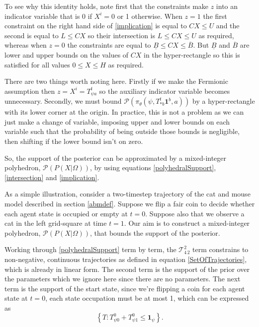 \documentclass{article}
\begin{document}
To see why this identity holds, note first that the constraints make $z$ into an indicator variable that is 0 if $X^i=0$ or 1 otherwise. When $z=1$ the first constraint on the right hand side of \eqref{implication} is equal to $CX \le U$ and the second is equal to $L \le CX$ so their intersection is $L \le  CX \le U$ as required, whereas when $z=0$ the constraints are equal to $\underline{B} \le CX \le \overline{B}$. But $\underline{B}$ and $\overline{B}$ are lower and upper bounds on the values of $CX$ in the hyper-rectangle so this is satisfied for all values $0 \le X \le H$ as required. 

There are two things worth noting here. Firstly if we make the Fermionic assumption then $z = X^i = T^t_{\psi a}$ so the auxiliary indicator variable becomes unnecessary. Secondly, we must bound $\mathcal{P}(\pi_\theta(\psi,T^t_{*b}\mathbf{1}^b,a))$ by a hyper-rectangle with its lower corner at the origin. In practice, this is not a problem as we can just make a change of variable, imposing upper and lower bounds on each variable such that the probability of being outside those bounds is negligible, then shifting if the lower bound isn't on zero.

So, the support of the posterior can be approximated by a mixed-integer polyhedron, $\mathcal{P}(P(X|\Omega))$, by using equations \eqref{polyhedralSupport}, \eqref{intersection} and \eqref{implication}.

As a simple illustration, consider a two-timestep trajectory of the cat and mouse model described in section \ref{abmdef}. Suppose we flip a fair coin to decide whether each agent state is occupied or empty at $t=0$. Suppose also that we observe a cat in the left grid-square at time $t=1$. Our aim is to construct a mixed-integer polyhedron, $\mathcal{P}(P(X|\Omega))$, that bounds the support of the posterior.

Working through \eqref{polyhedralSupport} term by term, the $\mathcal{T}^2_{4\,2}$ term constrains to non-negative, continuous trajectories as defined in equation \eqref{SetOfTrajectories}, which is already in linear form. The second term is the support of the prior over the parameters which we ignore here since there are no parameters. The next term is the support of the start state, since we're flipping a coin for each agent state at $t=0$, each state occupation must be at most 1, which can be expressed as
\[
\left\{T:T^0_{\psi 0} + T^0_{\psi 1} \le \mathbf{1}_{\psi}\right\}.
\]
\end{document}
